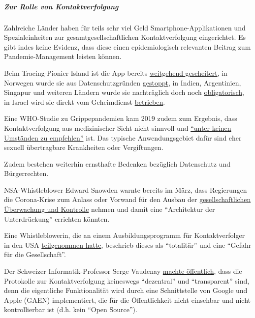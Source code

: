 \hypertarget{zur-rolle-von-kontaktverfolgung}{%
\subparagraph{\texorpdfstring{\textbf{Zur Rolle von
Kontaktverfolgung}}{Zur Rolle von Kontaktverfolgung}}\label{zur-rolle-von-kontaktverfolgung}}

Zahlreiche Länder haben für teils sehr viel Geld
Smartphone-Applikationen und Spezialeinheiten zur
gesamtgesellschaftlichen Kontaktverfolgung eingerichtet. Es gibt indes
keine Evidenz, dass diese einen epidemiologisch relevanten Beitrag zum
Pandemie-Management leisten können.

Beim Tracing-Pionier Island ist die App bereits
\href{https://www.technologyreview.com/2020/05/11/1001541/iceland-rakning-c19-covid-contact-tracing/}{weitgehend
gescheitert}, in Norwegen wurde sie aus Daten­schutz­gründen
\href{https://www.msn.com/en-us/news/technology/norway-to-halt-covid-19-track-and-trace-app-on-data-protection-concerns/ar-BB15uMEM}{gestoppt},
in Indien, Argentinien, Singapur und weiteren Ländern wurde sie
nachträglich doch noch
\href{https://www.tagesschau.de/ausland/indien-app-101.html}{obligatorisch},
in Israel wird sie direkt vom Geheimdienst
\href{https://www.jewishpress.com/news/the-courts/state-to-high-court-even-more-shin-bet-involvement-in-fighting-the-coronavirus/2020/04/14/}{betrieben}.

Eine WHO-Studie zu Grippepandemien kam 2019 zudem zum Ergebnis, dass
Kontaktverfolgung aus medizinischer Sicht nicht sinnvoll und
\href{https://apps.who.int/iris/bitstream/handle/10665/329438/9789241516839-eng.pdf\#page=9}{``unter
keinen Umständen zu empfehlen''} ist. Das typische Anwendungsgebiet
dafür sind eher sexuell übertragbare Krankheiten oder Vergiftungen.

Zudem bestehen weiterhin ernsthafte Bedenken bezüglich Datenschutz und
Bürgerrechten.

NSA-Whistleblower Edward Snowden warnte bereits im März, dass
Regierungen die Corona-Krise zum Anlass oder Vorwand für den Ausbau der
\href{https://www.youtube.com/watch?v=-pcQFTzck_c}{gesellschaftlichen
Überwachung und Kontrolle} nehmen und damit eine ``Architektur der
Unterdrückung'' errichten könnten.

Eine Whistleblowerin, die an einem Ausbildungsprogramm für
Kontaktverfolger in den USA
\href{https://www.youtube.com/watch?v=qFUyZWw7qoc}{teilgenommen hatte},
beschrieb dieses als ``totalitär'' und eine ``Gefahr für die
Gesellschaft''.

Der Schweizer Informatik-Professor Serge Vaudenay
\href{https://swprs.org/corona-app-ein-eklatanter-betrug/}{machte
öffentlich}, dass die Protokolle zur Kontaktverfolgung keineswegs
``dezentral'' und ``transparent'' sind, denn die eigentliche
Funktionalität wird durch eine Schnittstelle von Google und Apple (GAEN)
implementiert, die für die Öffentlichkeit nicht einsehbar und nicht
kontrollierbar ist (d.h. kein ``Open Source'').

